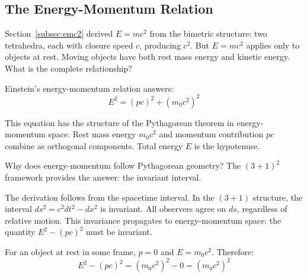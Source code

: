 \documentclass[aps,prd,preprint,superscriptaddress,showpacs,preprintnumbers,amsmath,amssymb,nofootinbib]{revtex4-2}
\begin{document}
\subsection{The Energy-Momentum Relation}
\label{subsec:energy-momentum}

Section~\ref{subsec:emc2} derived $E = mc^2$ from the bimetric structure: two tetrahedra, each with closure speed $c$, producing $c^2$. But $E = mc^2$ applies only to objects at rest. Moving objects have both rest mass energy and kinetic energy. What is the complete relationship?

Einstein's energy-momentum relation answers:
\begin{equation}
E^2 = (pc)^2 + (m_0 c^2)^2
\end{equation}

This equation has the structure of the Pythagorean theorem in energy-momentum space. Rest mass energy $m_0 c^2$ and momentum contribution $pc$ combine as orthogonal components. Total energy $E$ is the hypotenuse.

Why does energy-momentum follow Pythagorean geometry? The $(3+1)^2$ framework provides the answer: the invariant interval.

\vspace{1em}
\noindent
{}
\vspace{1cm}

The derivation follows from the spacetime interval. In the $(3+1)$ structure, the interval $ds^2 = c^2 dt^2 - dx^2$ is invariant. All observers agree on $ds$, regardless of relative motion. This invariance propagates to energy-momentum space: the quantity $E^2 - (pc)^2$ must be invariant.

For an object at rest in some frame, $p = 0$ and $E = m_0 c^2$. Therefore:
\begin{equation}
E^2 - (pc)^2 = (m_0 c^2)^2 - 0 = (m_0 c^2)^2
\end{equation}
\end{document}
